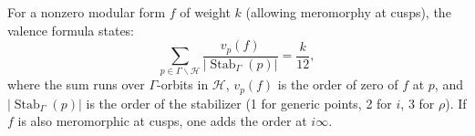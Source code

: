 For a nonzero modular form $f$ of weight $k$ (allowing meromorphy at cusps), the valence formula states:
$$
\sum_{p \in \Gamma \backslash \mathcal{H}} \frac{v_p(f)}{|\operatorname{Stab}_\Gamma(p)|} = \frac{k}{12},
$$
where the sum runs over $\Gamma$-orbits in $\mathcal{H}$, $v_p(f)$ is the order of zero of $f$ at $p$, and $|\operatorname{Stab}_\Gamma(p)|$ is the order of the stabilizer (1 for generic points, 2 for $i$, 3 for $\rho$). If $f$ is also meromorphic at cusps, one adds the order at $i\infty$.
